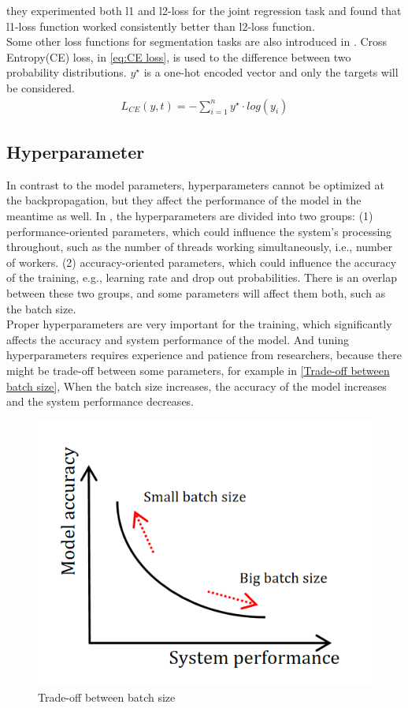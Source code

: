   they experimented both l1 and l2-loss for the joint regression task and found that l1-loss function worked consistently better than l2-loss function.\\
  Some other loss functions for segmentation tasks are also introduced in \cite{azad2023loss}. Cross Entropy(CE) loss, in \autoref{eq:CE loss}, is used to the difference between two
  probability distributions. $y^{\star}$ is a one-hot encoded vector and only the targets will be considered.
  \begin{align}
    L_{CE}(y,t) = -\sum_{i=1}^{n} y^{\star} \cdot log(y_{i})
     \label{eq:CE loss}
  \end{align}
  \subsection{Hyperparameter}
  In contrast to the model parameters, hyperparameters cannot be optimized at the backpropagation, but they affect the performance of the model in the meantime as well. 
  In \cite{4e568dfccc734aa6a8184f781bac6353}, the hyperparameters are divided into two groups: (1) performance-oriented parameters, which could influence the system's processing
  throughout, such as the number of threads working simultaneously, i.e., number of workers. (2) accuracy-oriented parameters, which could influence the accuracy of the training, e.g.,
  learning rate and drop out probabilities. There is an overlap between these two groups, and some parameters will affect them both, such as the batch size.\\
  Proper hyperparameters are very important for the training, which significantly affects the accuracy and system performance of the model. And tuning hyperparameters requires experience 
  and patience from researchers, because there might be trade-off between some parameters, for example in \autoref{Trade-off between batch size}, When the batch size increases, the 
  accuracy of the model increases and the system performance decreases.
  \begin{figure}
    \centering
    \includegraphics[width=0.6\linewidth]{example_images/batchSize}
    \caption{Trade-off between batch size}
    \label{Trade-off between batch size}
  \end{figure}
